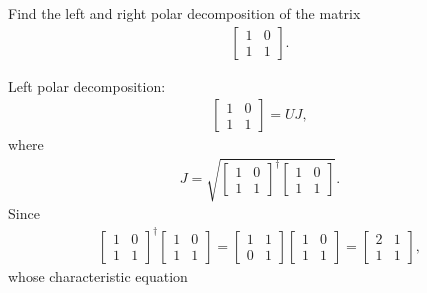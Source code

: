 \documentclass[en]{sol-man}
\begin{document}
\begin{exe}
    Find the left and right polar decomposition of the matrix
    \begin{align}
        \begin{bmatrix}
            1&0\\
            1&1
        \end{bmatrix}.
    \end{align}
\end{exe}
\begin{sol}
    Left polar decomposition:
    \begin{align}
        \begin{bmatrix}
            1&0\\
            1&1
        \end{bmatrix}=UJ,
    \end{align}
    where
    \begin{align}
        J=\sqrt{\begin{bmatrix}
            1&0\\
            1&1
        \end{bmatrix}^{\dagger}\begin{bmatrix}
            1&0\\
            1&1
        \end{bmatrix}}.
    \end{align}
    Since
    \begin{align}
        \begin{bmatrix}
            1&0\\
            1&1
        \end{bmatrix}^{\dagger}\begin{bmatrix}
            1&0\\
            1&1
        \end{bmatrix}=\begin{bmatrix}
            1&1\\
            0&1
        \end{bmatrix}\begin{bmatrix}
            1&0\\
            1&1
        \end{bmatrix}=\begin{bmatrix}
            2&1\\
            1&1
        \end{bmatrix},
    \end{align}
    whose characteristic equation
    \begin{align}

\end{align}
\end{sol}
\end{document}
